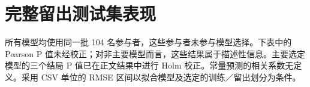 \documentclass[11pt,letterpaper]{article}
\begin{document}
\endgroup

\section{完整留出测试集表现}\label{ux5b8cux6574ux7559ux51faux6d4bux8bd5ux96c6ux8868ux73b0}

所有模型均使用同一批 104 名参与者，这些参与者未参与模型选择。下表中的 Pearson P 值未经校正；对非主要模型而言，这些结果属于描述性信息。主要选定模型的三个结局 P 值已在正文结果中进行 Holm 校正。常量预测的相关系数无定义。采用 CSV 单位的 RMSE 区间以拟合模型及选定的训练／留出划分为条件。


\par\medskip{}\par\nopagebreak

\begingroup\singlespacing\fontsize{10}{12}\selectfont\setlength{\parindent}{0pt}
\end{document}
